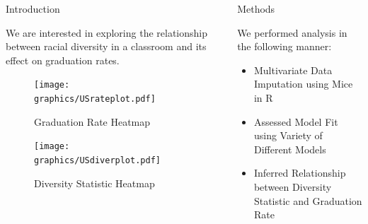 \documentclass[final]{beamer}
\newlength{\sepwid}
\newlength{\onecolwid}
\newlength{\twocolwid}
\begin{document}
\begin{frame}[t]
\begin{columns}[t]
\begin{column}{\onecolwid}
\begin{block}{Introduction}

We are interested in exploring the relationship between racial diversity in a classroom and its effect on graduation rates. 

\end{block}


\begin{figure}
\texttt{[image: graphics/USrateplot.pdf]}
\caption{Graduation Rate Heatmap}
\end{figure}

\begin{figure}
\texttt{[image: graphics/USdiverplot.pdf]}
\caption{Diversity Statistic Heatmap}
\end{figure}



\end{column} %

\begin{column}{\sepwid}\end{column} %

\begin{column}{\twocolwid} %

\begin{columns}[t,totalwidth=\twocolwid] %

\begin{column}{\onecolwid}\vspace{-.6in} %


\begin{block}{Methods}

We performed analysis in the following manner:
\begin{itemize}
\item Multivariate Data Imputation using Mice in R
\item Assessed Model Fit using Variety of Different Models
\item Inferred Relationship between Diversity Statistic and Graduation Rate
\end{itemize}


\end{block}
\end{column}
\end{columns}
\end{column}
\end{columns}
\end{frame}
\end{document}

